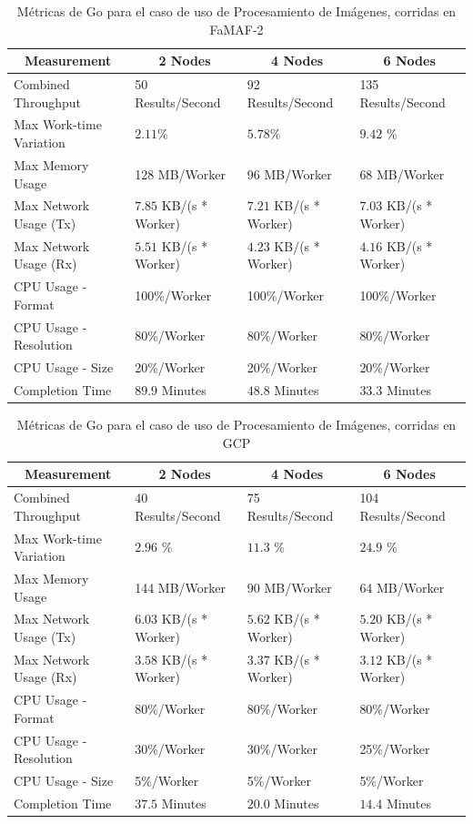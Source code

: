 \documentclass[11pt]{article}
\newcommand{\ipcap}[2]{\caption{Métricas de #1 para el caso de uso de Procesamiento de Imágenes, corridas en #2}}
\begin{document}
\begin{table}[H]
\centering
\begin{tabular}{|l|l|l|l|}
\hline
\multicolumn{1}{|c|}{Measurement} & \multicolumn{1}{c|}{2 Nodes} & \multicolumn{1}{c|}{4 Nodes} & \multicolumn{1}{c|}{6 Nodes} \\ \hline
Combined Throughput & 50 Results/Second & 92 Results/Second & 135 Results/Second \\ \hline
Max Work-time Variation & $2.11\%$& $5.78\%$& $9.42$ \% \\ \hline
Max Memory Usage & 128 MB/Worker & 96 MB/Worker & 68 MB/Worker \\ \hline
Max Network Usage (Tx) & $7.85$ KB/(s * Worker) & $7.21$ KB/(s * Worker) & $7.03$ KB/(s * Worker) \\ \hline
Max Network Usage (Rx) & $5.51$ KB/(s * Worker) & $4.23$ KB/(s * Worker) & $4.16$ KB/(s * Worker) \\ \hline
CPU Usage - Format & 100\%/Worker & 100\%/Worker & 100\%/Worker \\ \hline
CPU Usage - Resolution & 80\%/Worker & 80\%/Worker & 80\%/Worker \\ \hline
CPU Usage - Size & 20\%/Worker & 20\%/Worker & 20\%/Worker \\ \hline
Completion Time & $89.9$ Minutes & $48.8$ Minutes & $33.3$ Minutes \\ \hline
\end{tabular}
\ipcap{Go}{FaMAF-2}
\end{table}

\begin{table}[H]
\centering
\begin{tabular}{|l|l|l|l|}
\hline
\multicolumn{1}{|c|}{Measurement} & \multicolumn{1}{c|}{2 Nodes} & \multicolumn{1}{c|}{4 Nodes} & \multicolumn{1}{c|}{6 Nodes} \\ \hline
Combined Throughput & 40 Results/Second & 75 Results/Second & 104 Results/Second \\ \hline
Max Work-time Variation & $2.96$ \% & $11.3$ \% & $24.9$ \% \\ \hline
Max Memory Usage & 144 MB/Worker & 90 MB/Worker & 64 MB/Worker \\ \hline
Max Network Usage (Tx) & $6.03$ KB/(s * Worker) & $5.62$ KB/(s * Worker) & $5.20$ KB/(s * Worker) \\ \hline
Max Network Usage (Rx) & $3.58$ KB/(s * Worker) & $3.37$ KB/(s * Worker) & $3.12$ KB/(s * Worker) \\ \hline
CPU Usage - Format & 80\%/Worker & 80\%/Worker & 80\%/Worker \\ \hline
CPU Usage - Resolution & 30\%/Worker & 30\%/Worker & 25\%/Worker \\ \hline
CPU Usage - Size & 5\%/Worker & 5\%/Worker & 5\%/Worker \\ \hline
Completion Time & $37.5$ Minutes & $20.0$ Minutes & $14.4$ Minutes \\ \hline
\end{tabular}
\ipcap{Go}{GCP}
\end{table}
\end{document}
